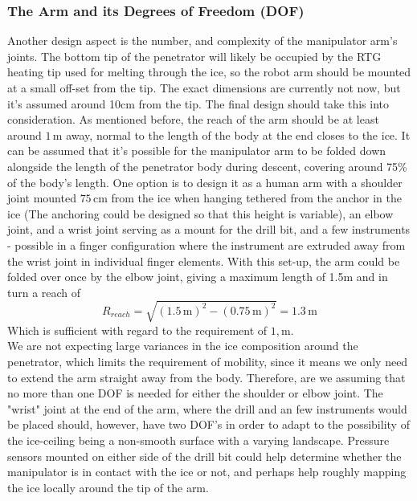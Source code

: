 \subsubsection{The Arm and its Degrees of Freedom (DOF)}
Another design aspect is the number, and complexity of the manipulator arm's joints. The bottom tip of the penetrator will likely be occupied by the RTG heating tip used for melting through the ice, so the robot arm should be mounted at a small off-set from the tip. The exact dimensions are currently not now, but it's assumed around 10cm from the tip. The final design should take this into consideration. As mentioned before, the reach of the arm should be at least around $1\, \mathrm{m}$ away, normal to the length of the body at the end closes to the ice. It can be assumed that it's possible for the manipulator arm to be folded down alongside the length of the penetrator body during descent, covering around 75\% of the body's length. One option is to design it as a human arm with a shoulder joint mounted $75\,\mathrm{cm}$ from the ice when hanging tethered from the anchor in the ice (The anchoring could be designed so that this height is variable), an elbow joint, and a wrist joint serving as a mount for the drill bit, and a few instruments - possible in a finger configuration where the instrument are extruded away from the wrist joint in individual finger elements. With this set-up, the arm could be folded over once by the elbow joint, giving a maximum length of 1.5m and in turn a reach of\\
\begin{equation}
R_{reach}=\sqrt{(1.5\,\mathrm{m})^2-(0.75\,\mathrm{m})^2}=1.3\,\mathrm{m}
\end{equation}
Which is sufficient with regard to the requirement of $1,\mathrm{m}$.\\
We are not expecting large variances in the ice composition around the penetrator, which limits the requirement of mobility, since it means we only need to extend the arm straight away from the body. Therefore, are we assuming that no more than one DOF is needed for either the shoulder or elbow joint. The "wrist" joint at the end of the arm, where the drill and an few instruments would be placed should, however, have two DOF's in order to adapt to the possibility of the ice-ceiling being a non-smooth surface with a varying landscape. Pressure sensors mounted on either side of the drill bit could help determine whether the manipulator is in contact with the ice or not, and perhaps help roughly mapping the ice locally around the tip of the arm.\\
